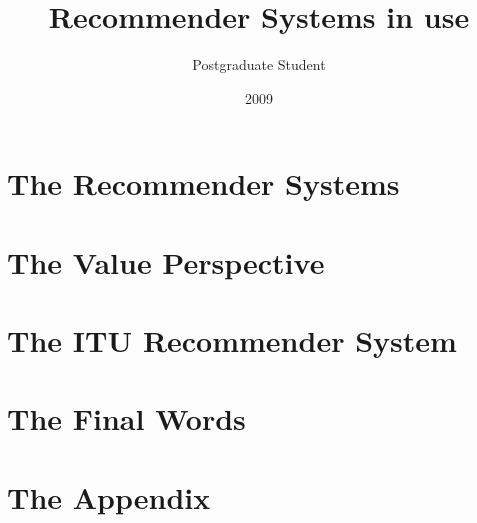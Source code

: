 \documentclass[10pt, oneside]{report}
\title{Recommender Systems in use}
\author{Postgraduate Student}
\date{2009}
\begin{document}
\newcommand\todo[1]{\textcolor{red}{#1}\PackageWarning{TODO:}{#1!}}

\maketitle


\begin{abstract}

\end{abstract}

\tableofcontents

\chapter{The Recommender Systems}
\label{chap:chapter1}





\chapter{The Value Perspective}
\label{chap:chapter2}

\chapter{The ITU Recommender System}
\label{chap:chapter3}




%

\chapter{The Final Words}
\label{chap:the_final_words}



\chapter{The Appendix}

\end{document}
